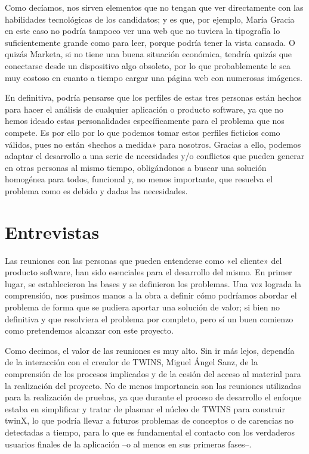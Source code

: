 Como decíamos, nos sirven elementos que no tengan que ver directamente con las habilidades tecnológicas de los candidatos; y es que, por ejemplo, María Gracia en este caso no podría tampoco ver una web que no tuviera la tipografía lo suficientemente grande como para leer, porque podría tener la vista cansada. O quizás Marketa, si no tiene una buena situación económica, tendría quizás que conectarse desde un dispositivo algo obsoleto, por lo que probablemente le sea muy costoso en cuanto a tiempo cargar una página web con numerosas imágenes.

En definitiva, podría pensarse que los perfiles de estas tres personas están hechos para hacer el análisis de cualquier aplicación o producto software, ya que no hemos ideado estas personalidades específicamente para el problema que nos compete. Es por ello por lo que podemos tomar estos perfiles ficticios como válidos, pues no están «hechos a medida» para nosotros. Gracias a ello, podemos adaptar el desarrollo a una serie de necesidades y/o conflictos que pueden generar en otras personas al mismo tiempo, obligándonos a buscar una solución homogénea para todos, funcional y, no menos importante, que resuelva el problema como es debido y dadas las necesidades.

\section{Entrevistas}
\label{sec:entrevistas}

Las reuniones con las personas que pueden entenderse como «el cliente» del producto software, han sido esenciales para el desarrollo del mismo. En primer lugar, se establecieron las bases y se definieron los problemas. Una vez lograda la comprensión, nos pusimos manos a la obra a definir cómo podríamos abordar el problema de forma que se pudiera aportar una solución de valor; si bien no definitiva y que resolviera el problema por completo, pero sí un buen comienzo como pretendemos alcanzar con este proyecto.

Como decimos, el valor de las reuniones es muy alto. Sin ir más lejos, dependía de la interacción con el creador de TWINS, Miguel Ángel Sanz, de la comprensión de los procesos implicados y de la cesión del acceso al material para la realización del proyecto. No de menos importancia son las reuniones utilizadas para la realización de pruebas, ya que durante el proceso de desarrollo el enfoque estaba en simplificar y tratar de plasmar el núcleo de TWINS para construir twinX, lo que podría llevar a futuros problemas de conceptos o de carencias no detectadas a tiempo, para lo que es fundamental el contacto con los verdaderos usuarios finales de la aplicación --o al menos en sus primeras fases--.%

